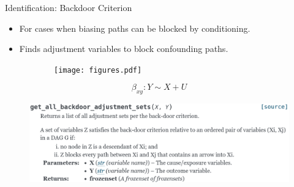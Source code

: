 \documentclass[aspectratio=169]{beamer}
\begin{document}
\begin{frame}{Identification: Backdoor Criterion}
	\begin{itemize}
		\item For cases when biasing paths can be blocked by conditioning.
		\item Finds adjustment variables to block confounding paths.
	\end{itemize}
	\begin{figure}
		\begin{subfigure}{0.5\textwidth}
			\centering
			\texttt{[image: figures.pdf]}
		\end{subfigure}%
		\begin{subfigure}{0.5 \textwidth}
			\begin{equation*}
				\beta_{xy}: Y \sim X + U
			\end{equation*}
		\end{subfigure}
	\end{figure}

	\begin{figure}
		\centering
		\includegraphics[scale=0.25]{imgs/backdoor.png}
	\end{figure}

\end{frame}
\end{document}
